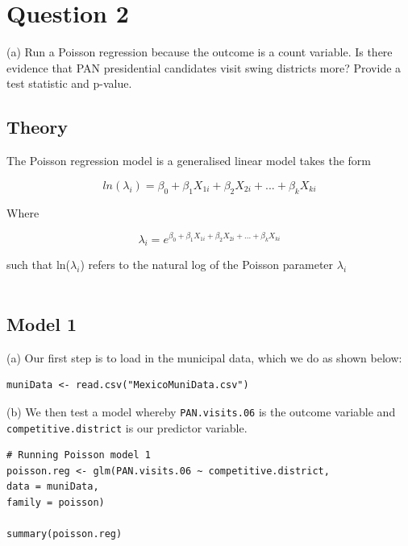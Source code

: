 \documentclass[12pt,letterpaper]{article}
\begin{document}
\pagebreak

\section{Question 2}

(a) Run a Poisson regression because the outcome is a count variable. Is there evidence that PAN presidential candidates visit swing districts more? Provide a test statistic and p-value.
\\

\subsection{Theory}

The Poisson regression model is a generalised linear model takes the form

\begin{equation}
ln(\lambda_i) = \beta_0 + \beta_1X_{1i} + \beta_2X_{2i} + ... + \beta_kX_{ki}
\end{equation}

Where

\begin{equation}
\lambda_i = e^{\beta_0 + \beta_1X_{1i} + \beta_2X_{2i} + ... + \beta_kX_{ki}}
\end{equation}

such that ln($\lambda_i$) refers to the natural log of the Poisson parameter $\lambda_i$
\\\\

\subsection{Model 1}

\noindent (a) Our first step is to load in the municipal data, which we do as shown below:
\\
\begin{lstlisting}
muniData <- read.csv("MexicoMuniData.csv")
\end{lstlisting}

\noindent (b) We then test a model whereby \texttt{PAN.visits.06} is the outcome variable and \texttt{competitive.district} is our predictor variable.
\\
\begin{lstlisting}
# Running Poisson model 1
poisson.reg <- glm(PAN.visits.06 ~ competitive.district,
data = muniData,
family = poisson)

summary(poisson.reg)
\end{lstlisting}
\end{document}
